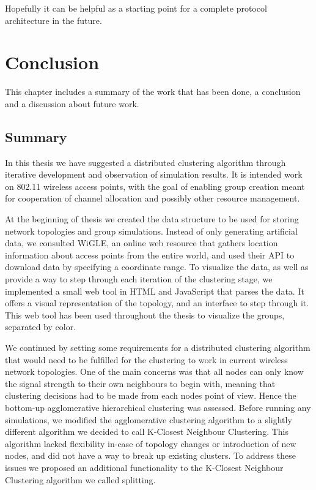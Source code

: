 Hopefully it can be helpful as a starting point for a complete protocol architecture in the future. 

\chapter{Conclusion}
This chapter includes a summary of the work that has been done, a conclusion and a discussion about future work. 
\section{Summary}
In this thesis we have suggested a distributed clustering algorithm through iterative development and observation of simulation results. It is intended work on 802.11 wireless access points,
with the goal of enabling group creation meant for cooperation of channel allocation and possibly other resource management. 

At the beginning of thesis we created the data structure to be used for storing network topologies and group simulations. Instead of only generating artificial data,
we consulted WiGLE, an online web resource that gathers location information about access points from the entire world, and used their API to download data by specifying
a coordinate range. To visualize the data, as well as provide a way to step through each iteration of the clustering stage, we implemented a small web tool in HTML and JavaScript that parses the data.
It offers a visual representation of the topology, and an interface to step through it. This web tool has been used throughout the thesis to visualize the groups, separated by color. 

We continued by setting some requirements for a distributed clustering algorithm that would need to be fulfilled for the clustering to work in current wireless network topologies.
One of the main concerns was that all nodes can only know the signal strength to their own neighbours to begin with, meaning that clustering decisions had to be made from each nodes point of view.
Hence the bottom-up agglomerative hierarchical clustering was assessed. Before running any simulations, we modified the agglomerative clustering algorithm to a slightly different algorithm 
we decided to call K-Closest Neighbour Clustering. This algorithm lacked flexibility in-case of topology changes or introduction of new nodes, and did not have a way to break up existing clusters.
To address these issues we proposed an additional functionality to the K-Closest Neighbour Clustering algorithm we called splitting.

